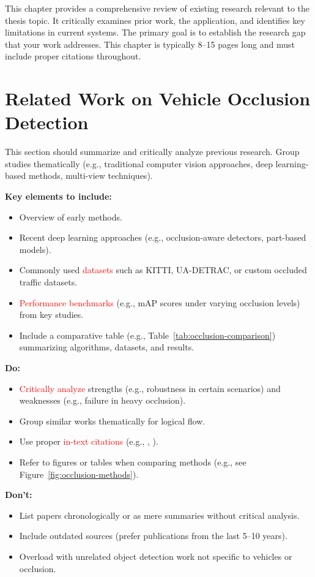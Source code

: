 \documentclass[12pt,a4paper]{report}
\theoremstyle{definition}
\theoremstyle{remark}
\begin{document}
This chapter provides a comprehensive review of existing research relevant to the thesis topic. It critically examines prior work, the application, and identifies key limitations in current systems. The primary goal is to establish the research gap that your work addresses. This chapter is typically 8--15 pages long and must include proper citations throughout.

\section{Related Work on Vehicle Occlusion Detection}
\label{sec:related-occlusion}
This section should summarize and critically analyze previous research. Group studies thematically (e.g., traditional computer vision approaches, deep learning-based methods, multi-view techniques).

\noindent \textbf{Key elements to include:}
\begin{itemize}
    \item Overview of early methods.
    \item Recent deep learning approaches (e.g., occlusion-aware detectors, part-based models).
    \item Commonly used \textcolor{red}{datasets} such as KITTI, UA-DETRAC, or custom occluded traffic datasets.
    \item \textcolor{red}{Performance benchmarks} (e.g., mAP scores under varying occlusion levels) from key studies.
    \item Include a comparative table (e.g., Table~\ref{tab:occlusion-comparison}) summarizing algorithms, datasets, and results.
\end{itemize}

\noindent \textbf{Do:}
\begin{itemize}
    \item \textcolor{red}{Critically analyze} strengths (e.g., robustness in certain scenarios) and weaknesses (e.g., failure in heavy occlusion).
    \item Group similar works thematically for logical flow.
    \item Use proper \textcolor{red}{in-text citations} (e.g., \cite{article1}, \cite{conference1,online1}).
    \item Refer to figures or tables when comparing methods (e.g., see Figure~\ref{fig:occlusion-methods}).
\end{itemize}

\noindent \textbf{Don’t:}
\begin{itemize}
    \item List papers chronologically or as mere summaries without critical analysis.
    \item Include outdated sources (prefer publications from the last 5--10 years).
    \item Overload with unrelated object detection work not specific to vehicles or occlusion.
\end{itemize}
\end{document}
